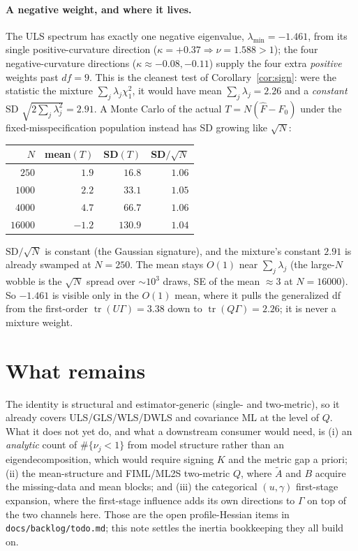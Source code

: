 \documentclass[11pt]{article}
\newcommand{\tr}{\operatorname{tr}}
\theoremstyle{plain}
\theoremstyle{remark}
\begin{document}
\paragraph{A negative weight, and where it lives.} The ULS spectrum has exactly
one negative eigenvalue, $\lambda_{\min}=-1.461$, from its single
positive-curvature direction ($\kappa=+0.37\Rightarrow\nu=1.588>1$); the four
negative-curvature directions ($\kappa\approx-0.08,-0.11$) supply the four extra
\emph{positive} weights past $df=9$. This is the cleanest test of
Corollary~\ref{cor:sign}: were the statistic the mixture $\sum_j\lambda_j\chi^2_1$,
it would have mean $\sum_j\lambda_j=2.26$ and a \emph{constant}
SD $\sqrt{2\sum_j\lambda_j^2}=2.91$. A Monte Carlo of the actual $T=N(\hat F-F_0)$
under the fixed-misspecification population instead has SD growing like $\sqrt N$:
\begin{center}
\begin{tabular}{rrrr}
$N$ & mean$(T)$ & SD$(T)$ & SD$/\sqrt N$\\\hline
$250$   & $1.9$  & $16.8$  & $1.06$\\
$1000$  & $2.2$  & $33.1$  & $1.05$\\
$4000$  & $4.7$  & $66.7$  & $1.06$\\
$16000$ & $-1.2$ & $130.9$ & $1.04$\\
\end{tabular}
\end{center}
$\mathrm{SD}/\sqrt N$ is constant (the Gaussian signature), and the mixture's
constant $2.91$ is already swamped at $N=250$. The mean stays $O(1)$ near
$\sum_j\lambda_j$ (the large-$N$ wobble is the $\sqrt N$ spread over $\sim10^3$
draws, SE of the mean $\approx3$ at $N=16000$). So $-1.461$ is visible only in the
$O(1)$ mean, where it pulls the generalized df from the first-order
$\tr(U\Gamma)=3.38$ down to $\tr(Q\Gamma)=2.26$; it is never a mixture weight.

\section*{What remains}

The identity is structural and estimator-generic (single- and two-metric), so it
already covers ULS/GLS/WLS/DWLS and covariance ML at the level of $Q$. What it
does not yet do, and what a downstream consumer would need, is (i) an
\emph{analytic} count of $\#\{\nu_j<1\}$ from model structure rather than an
eigendecomposition, which would require signing $K$ and the metric gap a priori;
(ii) the mean-structure and FIML/ML2S two-metric $Q$, where $\tilde A$ and $B$
acquire the missing-data and mean blocks; and (iii) the categorical
$(u,\gamma)$ first-stage expansion, where the first-stage influence adds its own
directions to $\Gamma$ on top of the two channels here. Those are the open
profile-Hessian items in \texttt{docs/backlog/todo.md}; this note settles the
inertia bookkeeping they all build on.
\end{document}
